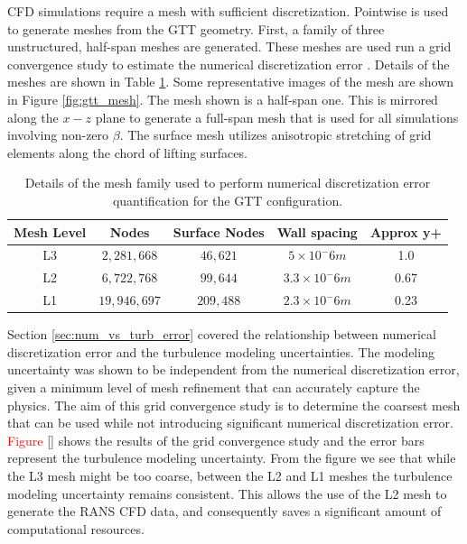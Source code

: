 CFD simulations require a mesh with sufficient discretization.
Pointwise is used to generate meshes from the GTT geometry. 
First, a family of three unstructured, half-span meshes are generated.
These meshes are used run a grid convergence study to estimate the numerical discretization error \cite{american_society_of_mechanical_engineers_standard_2009}. 
Details of the meshes are shown in Table \ref{tab:gtt_meshes}.
Some representative images of the mesh are shown in Figure \ref{fig:gtt_mesh}.
The mesh shown is a half-span one.
This is mirrored along the $x-z$ plane to generate a full-span mesh that is used for all simulations involving non-zero $\beta$.
The surface mesh utilizes anisotropic stretching of grid elements along the chord of lifting surfaces. 

\begin{table}
    \renewcommand{\arraystretch}{1.2}
    \centering
    \begin{tabular}{ c|c|c|c|c } 
         Mesh Level & Nodes & Surface Nodes & Wall spacing & Approx y+  \\ 
         \hline
         L3 & $2,281,668$ & $46,621$ & $5\times10^-6 m$ & 1.0 \\
         L2 & $6,722,768$ & $99,644$ & $3.3\times10^-6 m$ & 0.67 \\
         L1 & $19,946,697$ & $209,488$ & $2.3\times10^-6 m$ & 0.23 \\
         
    \end{tabular}
    \caption{Details of the mesh family used to perform numerical discretization error quantification for the GTT configuration.}
    \label{tab:gtt_meshes}
\end{table}

Section \ref{sec:num_vs_turb_error} covered the relationship between numerical discretization error and the turbulence modeling uncertainties. 
The modeling uncertainty was shown to be independent from the numerical discretization error, given a minimum level of mesh refinement that can accurately capture the physics. 
The aim of this grid convergence study is to determine the coarsest mesh that can be used while not introducing significant numerical discretization error. 
\textcolor{red}{Figure \ref{}} shows the results of the grid convergence study and the error bars represent the turbulence modeling uncertainty. 
From the figure we see that while the L3 mesh might be too coarse, between the L2 and L1 meshes the turbulence modeling uncertainty remains consistent. 
This allows the use of the L2 mesh to generate the RANS CFD data, and consequently saves a significant amount of computational resources. 

